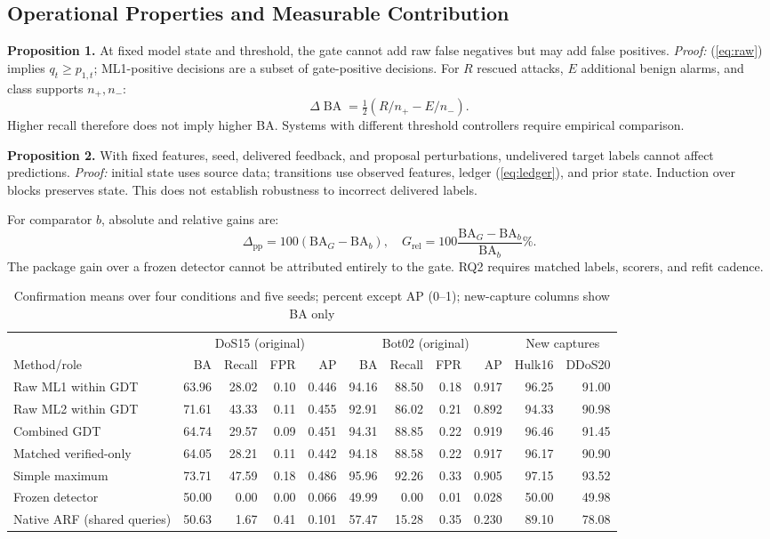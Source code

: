 \documentclass[conference]{IEEEtran}
\begin{document}
\subsection{Operational Properties and Measurable Contribution}
\textbf{Proposition 1.} At fixed model state and threshold, the gate cannot add raw false negatives but may add false positives. \emph{Proof:} (\ref{eq:raw}) implies $q_t\ge p_{1,t}$; ML1-positive decisions are a subset of gate-positive decisions. For $R$ rescued attacks, $E$ additional benign alarms, and class supports $n_+,n_-$:
\begin{equation}
 \Delta\operatorname{BA}=\tfrac12(R/n_+-E/n_-).\label{eq:tradeoff}
\end{equation}
Higher recall therefore does not imply higher BA. Systems with different threshold controllers require empirical comparison.

\textbf{Proposition 2.} With fixed features, seed, delivered feedback, and proposal perturbations, undelivered target labels cannot affect predictions. \emph{Proof:} initial state uses source data; transitions use observed features, ledger (\ref{eq:ledger}), and prior state. Induction over blocks preserves state. This does not establish robustness to incorrect delivered labels.

For comparator $b$, absolute and relative gains are:
\begin{equation}
 \Delta_{\mathrm{pp}}=100(\mathrm{BA}_G-\mathrm{BA}_b),\quad
 G_{\mathrm{rel}}=100\frac{\mathrm{BA}_G-\mathrm{BA}_b}{\mathrm{BA}_b}\%.\label{eq:gain}
\end{equation}
The package gain over a frozen detector cannot be attributed entirely to the gate. RQ2 requires matched labels, scorers, and refit cadence.

\begin{table}[t]
\caption{Confirmation means over four conditions and five seeds; percent except AP (0--1); new-capture columns show BA only}
\label{tab:results}\centering\footnotesize
\begin{tabular}{lrrrrrrrrrr}\hline
&\multicolumn{4}{c}{DoS15 (original)}&\multicolumn{4}{c}{Bot02 (original)}&\multicolumn{2}{c}{New captures}\\
Method/role & BA & Recall & FPR & AP & BA & Recall & FPR & AP & Hulk16 & DDoS20\\\hline
Raw ML1 within GDT &63.96&28.02&0.10&0.446&94.16&88.50&0.18&0.917&96.25&91.00\\
Raw ML2 within GDT &71.61&43.33&0.11&0.455&92.91&86.02&0.21&0.892&94.33&90.98\\
Combined GDT &64.74&29.57&0.09&0.451&94.31&88.85&0.22&0.919&96.46&91.45\\
Matched verified-only &64.05&28.21&0.11&0.442&94.18&88.58&0.22&0.917&96.17&90.90\\
Simple maximum &73.71&47.59&0.18&0.486&95.96&92.26&0.33&0.905&97.15&93.52\\
Frozen detector &50.00&0.00&0.00&0.066&49.99&0.00&0.01&0.028&50.00&49.98\\
Native ARF (shared queries) &50.63&1.67&0.41&0.101&57.47&15.28&0.35&0.230&89.10&78.08\\\hline
\end{tabular}
\end{table}
\end{document}
